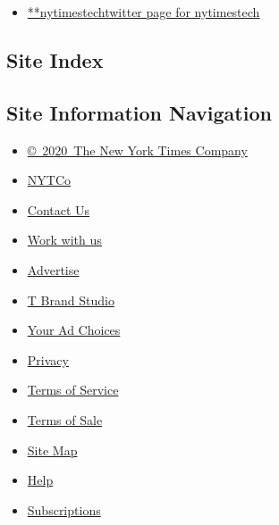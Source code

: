 \begin{itemize}
\tightlist
\item
  \href{https://twitter.com/nytimestech}{**nytimestechtwitter page for
  nytimestech}
\end{itemize}

\hypertarget{site-index}{%
\subsection{Site Index}\label{site-index}}

\hypertarget{site-information-navigation}{%
\subsection{Site Information
Navigation}\label{site-information-navigation}}

\begin{itemize}
\tightlist
\item
  \href{https://help.nytimes.com/hc/en-us/articles/115014792127-Copyright-notice}{©~2020~The
  New York Times Company}
\end{itemize}

\begin{itemize}
\tightlist
\item
  \href{https://www.nytco.com/}{NYTCo}
\item
  \href{https://help.nytimes.com/hc/en-us/articles/115015385887-Contact-Us}{Contact
  Us}
\item
  \href{https://www.nytco.com/careers/}{Work with us}
\item
  \href{https://nytmediakit.com/}{Advertise}
\item
  \href{http://www.tbrandstudio.com/}{T Brand Studio}
\item
  \href{https://www.nytimes.com/privacy/cookie-policy\#how-do-i-manage-trackers}{Your
  Ad Choices}
\item
  \href{https://www.nytimes.com/privacy}{Privacy}
\item
  \href{https://help.nytimes.com/hc/en-us/articles/115014893428-Terms-of-service}{Terms
  of Service}
\item
  \href{https://help.nytimes.com/hc/en-us/articles/115014893968-Terms-of-sale}{Terms
  of Sale}
\item
  \href{https://spiderbites.nytimes.com}{Site Map}
\item
  \href{https://help.nytimes.com/hc/en-us}{Help}
\item
  \href{https://www.nytimes.com/subscription?campaignId=37WXW}{Subscriptions}
\end{itemize}
